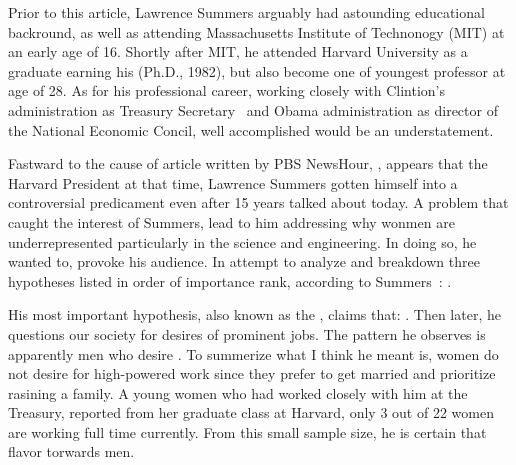 
\par
Prior to this article, Lawrence Summers arguably had astounding educational backround, 
as well as attending Massachusetts Institute of Technonogy (MIT) at an early age of 16.
Shortly after MIT, he attended Harvard University as a graduate earning his (Ph.D., 1982),
but also become one of youngest professor at age of 28.\cite{summersedu} As for his
professional career, working closely with Clintion's administration as Treasury 
Secretary~\cite{ustreasury} and Obama administration as director of the National Economic
Concil,\cite{economicconcil} well accomplished would be an understatement.

\par
Fastward to the cause of article written by PBS NewsHour, ,\cite{summers} appears that the Harvard 
President at that time, Lawrence Summers gotten himself into a controversial predicament 
even after 15 years talked about today. A problem that caught the interest of Summers, 
lead to him addressing why wonmen are underrepresented particularly in the science and 
engineering. In doing so, he wanted to,  provoke his audience. In attempt to
analyze and breakdown three hypotheses listed in order of importance rank, according to 
Summers~\cite{summers}: 
.

\par
His most important hypothesis, also known as the ,
claims that: \cite{summers}. Then later,
he questions our society for desires of prominent jobs. The pattern he observes is apparently
men who desire \cite{summers}. To summerize what I think he
meant is, women do not desire for high-powered work since they prefer to get married and 
prioritize rasining a family. A young women who had worked closely with him at the Treasury,
reported from her graduate class at Harvard, only 3 out of 22 women are working full time 
currently. From this small sample size, he is certain that 
flavor torwards men.

